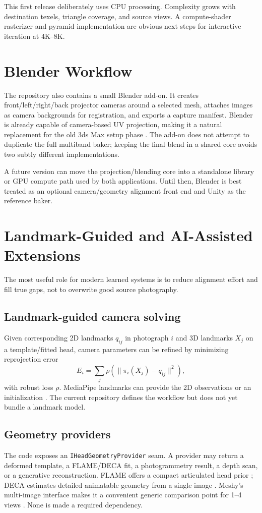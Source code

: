 \documentclass[10pt]{article}
\begin{document}
This first release deliberately uses CPU processing. Complexity grows with destination texels, triangle coverage, and source views. A compute-shader rasterizer and pyramid implementation are obvious next steps for interactive iteration at 4K--8K.

\section{Blender Workflow}
The repository also contains a small Blender add-on. It creates front/left/right/back projector cameras around a selected mesh, attaches images as camera backgrounds for registration, and exports a capture manifest. Blender is already capable of camera-based UV projection, making it a natural replacement for the old 3ds Max setup phase \cite{blender_uv_project_2026}. The add-on does not attempt to duplicate the full multiband baker; keeping the final blend in a shared core avoids two subtly different implementations.

A future version can move the projection/blending core into a standalone library or GPU compute path used by both applications. Until then, Blender is best treated as an optional camera/geometry alignment front end and Unity as the reference baker.

\section{Landmark-Guided and AI-Assisted Extensions}
The most useful role for modern learned systems is to reduce alignment effort and fill true gaps, not to overwrite good source photography.

\subsection{Landmark-guided camera solving}
Given corresponding 2D landmarks $q_{ij}$ in photograph $i$ and 3D landmarks $X_j$ on a template/fitted head, camera parameters can be refined by minimizing reprojection error
\begin{equation}
    E_i=\sum_j \rho\left(\|\pi_i(X_j)-q_{ij}\|^2\right),
\end{equation}
with robust loss $\rho$. MediaPipe landmarks can provide the 2D observations or an initialization \cite{mediapipe_face_2026}. The current repository defines the workflow but does not yet bundle a landmark model.

\subsection{Geometry providers}
The code exposes an \texttt{IHeadGeometryProvider} seam. A provider may return a deformed template, a FLAME/DECA fit, a photogrammetry result, a depth scan, or a generative reconstruction. FLAME offers a compact articulated head prior \cite{flame_2017}; DECA estimates detailed animatable geometry from a single image \cite{deca_2021}. Meshy's multi-image interface makes it a convenient generic comparison point for 1--4 views \cite{meshy_multiimage_2026}. None is made a required dependency.
\end{document}
